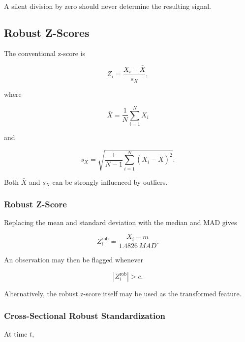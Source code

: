 \documentclass[11pt,a4paper]{article}
\begin{document}
A silent division by zero should never determine the resulting signal.


\subsection{Robust Z-Scores}
\label{subsec:robust_z_scores}

The conventional z-score is

\begin{equation}
Z_i
=
\frac{
X_i-\bar{X}
}{
s_X
},
\end{equation}

where

\begin{equation}
\bar{X}
=
\frac{1}{N}
\sum_{i=1}^{N}
X_i
\end{equation}

and

\begin{equation}
s_X
=
\sqrt{
\frac{1}{N-1}
\sum_{i=1}^{N}
(X_i-\bar{X})^2
}.
\end{equation}

Both $\bar{X}$ and $s_X$ can be strongly influenced by outliers.


\subsubsection{Robust Z-Score}

Replacing the mean and standard deviation with the median and MAD gives

\begin{equation}
\boxed{
Z_i^{\mathrm{rob}}
=
\frac{
X_i-m
}{
1.4826\,MAD
}.
}
\end{equation}

An observation may then be flagged whenever

\begin{equation}
\boxed{
|Z_i^{\mathrm{rob}}|
>
c.
}
\end{equation}

Alternatively, the robust z-score itself may be used as the transformed
feature.


\subsubsection{Cross-Sectional Robust Standardization}

At time $t$,
\end{document}
